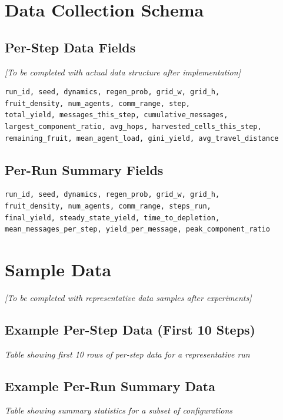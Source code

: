 \section{Data Collection Schema}

\subsection{Per-Step Data Fields}

\textit{[To be completed with actual data structure after implementation]}

\begin{verbatim}
run_id, seed, dynamics, regen_prob, grid_w, grid_h, 
fruit_density, num_agents, comm_range, step, 
total_yield, messages_this_step, cumulative_messages, 
largest_component_ratio, avg_hops, harvested_cells_this_step, 
remaining_fruit, mean_agent_load, gini_yield, avg_travel_distance
\end{verbatim}

\subsection{Per-Run Summary Fields}

\begin{verbatim}
run_id, seed, dynamics, regen_prob, grid_w, grid_h, 
fruit_density, num_agents, comm_range, steps_run, 
final_yield, steady_state_yield, time_to_depletion, 
mean_messages_per_step, yield_per_message, peak_component_ratio
\end{verbatim}

\section{Sample Data}

\textit{[To be completed with representative data samples after experiments]}

\subsection{Example Per-Step Data (First 10 Steps)}

\textit{Table showing first 10 rows of per-step data for a representative run}

\subsection{Example Per-Run Summary Data}

\textit{Table showing summary statistics for a subset of configurations}

